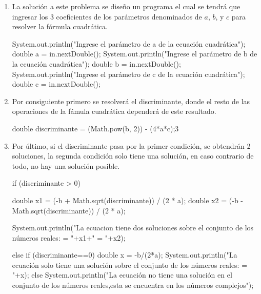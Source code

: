 \begin{enumerate}
    \item La solución a este problema se diseño un programa el cual se tendrá que ingresar los 3 coeficientes de los parámetros denominados de $a$, $b$, y $c$ para resolver la fórmula cuadrática.
    
    
    \begin{javaCode}
    
        System.out.println("Ingrese el parámetro de a de la ecuación cuadrática");
            double a = in.nextDouble();
            System.out.println("Ingrese el parámetro de b de la ecuación cuadrática");
            double b = in.nextDouble();
            System.out.println("Ingrese el parámetro de c de la ecuación cuadrática");
            double c = in.nextDouble();
            
    \end{javaCode}
    
    \item Por consiguiente primero se resolverá el discriminante, donde el resto de las operaciones de la fámula cuadrática dependerá de este resultado.
    
    \begin{javaCode}
        double discriminante = (Math.pow(b, 2)) - (4*a*c);3
    \end{javaCode}
    
    \item Por último, si el discriminante pasa por la primer condición, se obtendrán 2 soluciones, la segunda condición solo tiene una solución, en caso contrario de todo, no hay una solución posible.
    
    \begin{javaCode}
        if (discriminante > 0) {
                double x1 = (-b + Math.sqrt(discriminante)) / (2 * a);
                double x2 = (-b - Math.sqrt(discriminante)) / (2 * a);
                
                System.out.println("La ecuacion tiene dos soluciones sobre el conjunto de los números reales:  = "+x1+" = "+x2);
            } else {
                if (discriminante==0) {
                    double x = -b/(2*a);
                    System.out.println("La ecuación solo tiene una solución sobre el conjunto de los números reales: \nx = "+x);
                } else {
                    System.out.println("La ecuación no tiene una solución en el conjunto de los números reales,esta se encuentra en los números complejos");
                }
            }
    \end{javaCode}
\end{enumerate}
